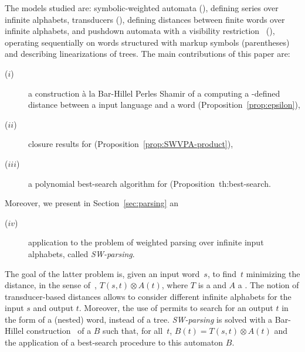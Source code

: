\noindent
The models studied are: 
symbolic-weighted automata (\SWA),
defining series over infinite alphabets, 
transducers (\SWT), 
defining distances between finite words over infinite alphabets, %
and pushdown automata with a visibility restriction~\cite{AlurMadhusudan09nested} (\SWVPA),
operating sequentially on %
words structured with markup symbols (parentheses) and describing linearizations of trees.
%
The main contributions of this paper are:
\begin{description}
\item[($i$)] a construction à la Bar-Hillel Perles Shamir of a \SWA
     computing a \SWT-defined distance between a \SWA input language and a word (Proposition~\ref{prop:epsilon}), 
\item[($ii$)] closure results for \SWVPA (Proposition~\ref{prop:SWVPA-product}), 
\item[($iii$)] a polynomial best-search algorithm for \SWVPA (Proposition~{th:best-search}. %
\end{description}
%
Moreover, we present in Section~\ref{sec:parsing} an 
\begin{description}
\item[($iv$)] application to the problem of weighted parsing over infinite input alphabets, 
called \emph{SW-parsing}. 
\end{description}
%
The goal of the latter problem is, given an input word~$s$, 
to find~$t$ minimizing the distance, in the sense of~\cite{Mohri03ijfcs}, 
$T(s, t) \otimes A(t)$, where $T$ is a \SWT and $A$ a \SWVPA.
The notion of transducer-based distances allows to consider 
different infinite alphabets for the input $s$ and output $t$.
Moreover, the use of \SWVPA permits to search for an output $t$ in the form of a (nested) word, 
instead of a tree.
\emph{SW-parsing} is solved with a Bar-Hillel construction~\cite{NederhofSatta03ParsingIntersection} 
of a \SWVPA $B$ such that, for all~$t$, $B(t) = T(s, t) \otimes A(t)$
and the application of a best-search procedure to this automaton $B$.

